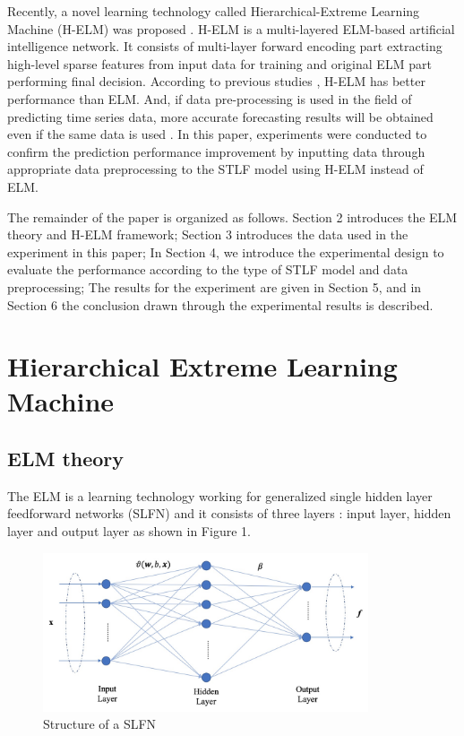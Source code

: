 \documentclass[runningheads,a4paper]{llncs}
\begin{document}
Recently, a novel learning technology called Hierarchical-Extreme Learning Machine (H-ELM) was proposed \cite{helm}. H-ELM is a multi-layered ELM-based artificial intelligence network. It consists of multi-layer forward encoding part extracting high-level sparse features from input data for training and original ELM part performing final decision. According to previous studies \cite{helm}, H-ELM has better performance than ELM. And, if data pre-processing is used in the field of predicting time series data, more accurate forecasting results will be obtained even if the same data is used \cite{pre_process}. In this paper, experiments were conducted to confirm the prediction performance improvement by inputting data through appropriate data preprocessing to the STLF model using H-ELM instead of ELM.

The remainder of the paper is organized as follows. Section 2 introduces the ELM theory and H-ELM framework; Section 3 introduces the data used in the experiment in this paper; In Section 4, we introduce the experimental design to evaluate the performance according to the type of STLF model and data preprocessing; The results for the experiment are given in Section 5, and in Section 6 the conclusion drawn through the experimental results is described.


\section{Hierarchical Extreme Learning Machine}

\subsection{ELM theory}

The ELM is a learning technology working for generalized single hidden layer feedforward networks (SLFN) and it consists of three layers \cite{elm_theory}: input layer, hidden layer and output layer as shown in Figure 1.

\begin{figure}
\centering
\includegraphics[width=9.6cm]{elm_figure}
\caption{Structure of a SLFN}
\label{fig:elm_figure}
\end{figure}
\end{document}

